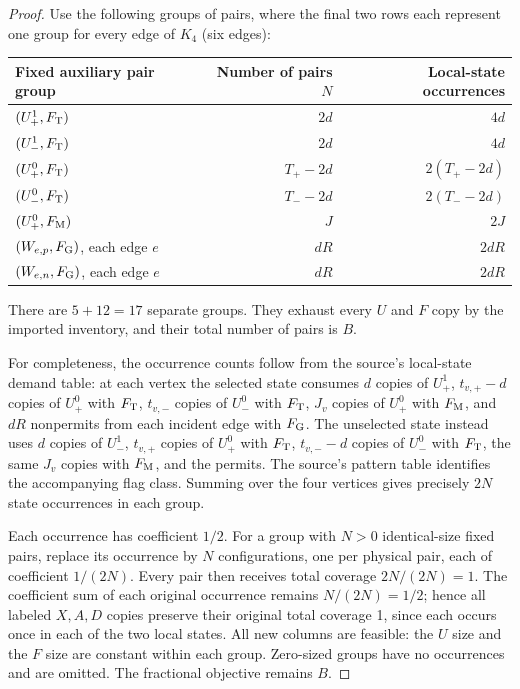 \documentclass[11pt,a4paper]{article}
\begin{document}
\begin{proof}
Use the following groups of pairs, where the final two rows each represent one group for every edge of $K_4$ (six edges):
\begin{center}
\begin{tabular}{@{}lrr@{}}\toprule
Fixed auxiliary pair group & Number of pairs $N$ & Local-state occurrences \\\midrule
$(U_+^1,F_{\rm T})$ & $2d$ & $4d$ \\
$(U_-^1,F_{\rm T})$ & $2d$ & $4d$ \\
$(U_+^0,F_{\rm T})$ & $T_+-2d$ & $2(T_+-2d)$ \\
$(U_-^0,F_{\rm T})$ & $T_--2d$ & $2(T_--2d)$ \\
$(U_+^0,F_{\rm M})$ & $J$ & $2J$ \\
$(W_{e,p},F_{\rm G})$, each edge $e$ & $dR$ & $2dR$ \\
$(W_{e,n},F_{\rm G})$, each edge $e$ & $dR$ & $2dR$ \\\bottomrule
\end{tabular}
\end{center}
There are $5+12=17$ separate groups. They exhaust every $U$ and $F$ copy by the imported inventory, and their total number of pairs is $B$.

For completeness, the occurrence counts follow from the source's local-state demand table: at each vertex the selected state consumes $d$ copies of $U_+^1$, $t_{v,+}-d$ copies of $U_+^0$ with $F_{\rm T}$, $t_{v,-}$ copies of $U_-^0$ with $F_{\rm T}$, $J_v$ copies of $U_+^0$ with $F_{\rm M}$, and $dR$ nonpermits from each incident edge with $F_{\rm G}$. The unselected state instead uses $d$ copies of $U_-^1$, $t_{v,+}$ copies of $U_+^0$ with $F_{\rm T}$, $t_{v,-}-d$ copies of $U_-^0$ with $F_{\rm T}$, the same $J_v$ copies with $F_{\rm M}$, and the permits. The source's pattern table identifies the accompanying flag class. Summing over the four vertices gives precisely $2N$ state occurrences in each group.

Each occurrence has coefficient $1/2$. For a group with $N>0$ identical-size fixed pairs, replace its occurrence by $N$ configurations, one per physical pair, each of coefficient $1/(2N)$. Every pair then receives total coverage $2N/(2N)=1$. The coefficient sum of each original occurrence remains $N/(2N)=1/2$; hence all labeled $X,A,D$ copies preserve their original total coverage 1, since each occurs once in each of the two local states. All new columns are feasible: the $U$ size and the $F$ size are constant within each group. Zero-sized groups have no occurrences and are omitted. The fractional objective remains $B$.
\end{proof}
\end{document}
